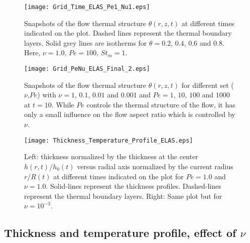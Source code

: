 \begin{figure}[h!]
  \begin{center}
    \graphicspath{ {/Users/thorey/Documents/These/Projet/Refroidissement/Skin_Model/Figure/JFM_V13/} }
    \texttt{[image: Grid\_Time\_ELAS\_Pe1\_Nu1.eps]}
    \caption{Snapshots of  the flow thermal  structure $\theta(r,z,t)$
      at  different  times  indicated   on  the  plot.   Dashed  lines
      represent  the thermal  boundary  layers. Solid  grey lines  are
      isotherms for  $\theta =  0.2$, $0.4$,  $0.6$ and  $0.8$.  Here,
      $\nu=1.0$, $Pe =100$, $St_m = 1$.}
    \label{C3-Grid_Time_ELAS}
  \end{center}
\end{figure}

\begin{figure}[h!]
  \begin{center}
    \graphicspath{ {/Users/thorey/Documents/These/Projet/Refroidissement/Skin_Model/Figure/JFM_V13/} }
    \texttt{[image: Grid\_PeNu\_ELAS\_Final\_2.eps]}
    \caption{Snapshots of  the flow thermal  structure $\theta(r,z,t)$
      for different set ($\nu$,$Pe$) with  $\nu= 1$, $0.1$, $0.01$ and
      $0.001$ and  $Pe=1$, $10$,  $100$ and  $1000$ at  $t=10$.  While
      $Pe$ controls the  thermal structure of the flow, it  has only a
      small influence on the flow  aspect ratio which is controlled by
      $\nu$.}
    \label{C3-Grid_PeNu_ELAS}
  \end{center}
\end{figure}

\begin{figure}[h!]
  \begin{center}
    \graphicspath{ {/Users/thorey/Documents/These/Projet/Refroidissement/Skin_Model/Figure/JFM_V13/} }
    \texttt{[image: Thickness\_Temperature\_Profile\_ELAS.eps]}
    \caption{Left: thickness normalized by the thickness at the center
      $h(r,t)/h_0(t)$  versus radial  axis normalized  by the  current
      radius $r/R(t)$  at different  times indicated  on the  plot for
      $Pe=1.0$  and $\nu=1.0$.   Solid-lines  represent the  thickness
      profiles.  Dashed-lines  represent the thermal  boundary layers.
      Right: Same plot but for $\nu=10^{-3}$.}
    \label{C3-Thickness_Temperature_Profile_ELAS}
  \end{center}
\end{figure}



\subsection{Thickness and temperature profile, effect of $\nu$}
\label{C3-sec:thickn-temp-prof-1-e}

